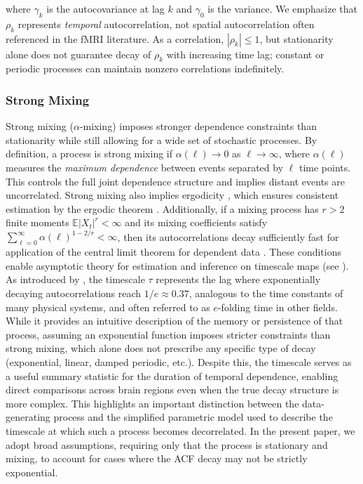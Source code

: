 \documentclass[9pt]{article}
\begin{document}
\noindent where $\gamma_k$ is the autocovariance at lag $k$ and $\gamma_0$ is the variance. We emphasize that $\rho_k$ represents \textit{temporal} autocorrelation, not spatial autocorrelation often referenced in the fMRI literature. As a correlation, $|\rho_k|\le 1$, but stationarity alone does not guarantee decay of $\rho_k$ with increasing time lag; constant or periodic processes can maintain nonzero correlations indefinitely. 

\subsubsection{Strong Mixing} \label{sec:strong-mixing}
Strong mixing ($\alpha$-mixing) imposes stronger dependence constraints than stationarity while still allowing for a wide set of stochastic processes. By definition, a process is strong mixing if $\alpha(\ell) \rightarrow 0$ as $\ell \rightarrow \infty$, where $\alpha(\ell)$ measures the \emph{maximum dependence} between events separated by $\ell$ time points. This controls the full joint dependence structure and implies distant events are uncorrelated. Strong mixing also implies ergodicity \citep[Chapter~14.12]{hansen_econometrics_2022}, which ensures consistent estimation by the ergodic theorem \citep[Theorem~14.9]{hansen_econometrics_2022}. Additionally, if a mixing process has $r>2$ finite moments $\mathbb{E}|X_t|^r < \infty$ and its mixing coefficients satisfy $\sum_{\ell=0}^{\infty} \alpha(\ell)^{1-2/r} < \infty$, then its autocorrelations decay sufficiently fast for application of the central limit theorem for dependent data \citep[Theorem~14.15]{hansen_econometrics_2022}. These conditions enable asymptotic theory for estimation and inference on timescale maps (see ).\\

As introduced by \citet{murray_hierarchy_2014}, the timescale $\tau$ represents the lag where exponentially decaying autocorrelations reach $1/e \approx 0.37$, analogous to the time constants of many physical systems, and often referred to as $e$-folding time in other fields. While it provides an intuitive description of the memory or persistence of that process, assuming an exponential function imposes stricter constraints than strong mixing, which alone does not prescribe any specific type of decay (exponential, linear, damped periodic, etc.). Despite this, the timescale serves as a useful summary statistic for the duration of temporal dependence, enabling direct comparisons across brain regions even when the true decay structure is more complex. This highlights an important distinction between the data-generating process and the simplified parametric model used to describe the timescale at which such a process becomes decorrelated. In the present paper, we adopt broad assumptions, requiring only that the process is stationary and mixing, to account for cases where the ACF decay may not be strictly exponential.
\end{document}
